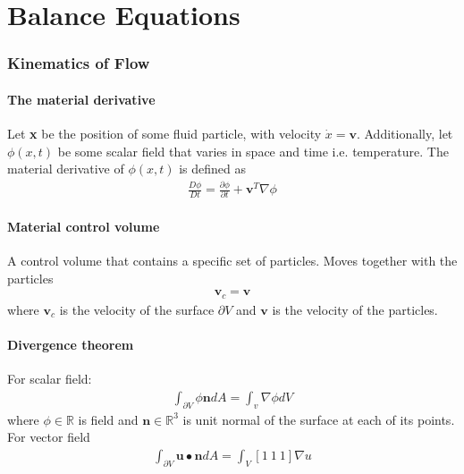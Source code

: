 \part{Balance Equations}
\section{Kinematics of Flow}
\subsection{The material derivative}
Let \textbf{x} be the position of some fluid particle, with velocity $\Dot{x}=\mathbf{v}$. Additionally, let $\phi(x,t)$ be some scalar field that varies in space and time i.e. temperature. The material derivative of $\phi(x,t)$ is defined as 
\begin{align}
    \frac{D\phi}{Dt}=\frac{\partial\phi}{\partial t} + \mathbf{v}^T\nabla\phi
\end{align}

\subsection{Material control volume}
A control volume that contains a specific set of particles. Moves together with the particles
\begin{align}
    \mathbf{v}_c=\mathbf{v}
\end{align}
where $\mathbf{v}_c$ is the velocity of the surface $\partial V$ and $\mathbf{v}$ is the velocity of the particles.

\subsection{Divergence theorem}
For scalar field:
\begin{align}
    \int_{\partial V}\phi\mathbf{n}dA=\int_v\nabla\phi dV
\end{align}
where $\phi \in \mathbb{R}$ is field and $\mathbf{n} \in \mathbb{R}^3$ is unit normal of the surface at each of its points. For vector field
\begin{align}
    \int_{\partial V}\mathbf{u}\bullet\mathbf{n}dA = \int_V [1\:1\: 1]\nabla u
\end{align}


